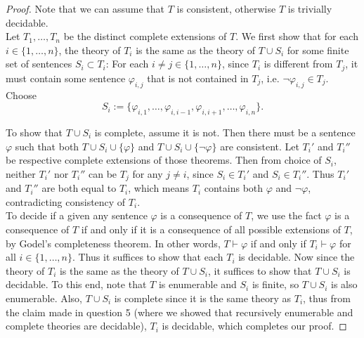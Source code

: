 \documentclass{article}
\begin{document}
\begin{enumerate}[label={\bf Q\arabic*:}]
    \begin{proof}
      Note that we can assume that $T$ is consistent, otherwise $T$ is
      trivially decidable. \\

      Let $T_1,\ldots,T_n$ be the distinct complete extensions of $T$.
      We first show that for each $i\in\{1,\ldots,n\}$, the theory of $T_i$
      is the same as the theory of $T\cup S_i$ for some finite set of
      sentences $S_i\subset T_i$: For each $i\neq j\in\{1,\ldots,n\}$,
      since $T_i$ is different from $T_j$, it must contain some sentence
      $\varphi_{i,j}$ that is not contained in $T_j$, i.e.
      $\neg\varphi_{i,j}\in T_j$. Choose
      \[S_i :=\{\varphi_{i,1},\ldots,\varphi_{i,i-1},
      \varphi_{i,i+1},\ldots,\varphi_{i,n}\}.\]

      To show that $T\cup S_i$ is complete, assume it is not. Then there
      must be a sentence $\varphi$ such that both $T\cup
      S_i\cup\{\varphi\}$ and $T\cup S_i\cup\{\neg\varphi\}$ are
      consistent. Let $T_i'$ and $T_i''$ be respective complete extensions
      of those theorems. Then from choice of $S_i$, neither $T_i'$ nor
      $T_i''$ can be $T_j$ for any $j\neq i$, since $S_i\in T_i'$ and
      $S_i\in T_i''$. Thus $T_i'$ and $T_i''$ are both equal to $T_i$,
      which means $T_i$ contains both $\varphi$ and $\neg\varphi$,
      contradicting consistency of $T_i$. \\

      To decide if a given any sentence $\varphi$ is a consequence of $T$,
      we use the fact $\varphi$ is a consequence of $T$ if and only if it
      is a consequence of all possible extensions of $T$, by Godel's
      completeness theorem. In other words, $T\vdash\varphi$ if and only if
      $T_i\vdash\varphi$ for all $i\in\{1,\ldots,n\}$. Thus it suffices to
      show that each $T_i$ is decidable. Now since the theory of $T_i$ is
      the same as the theory of $T\cup S_i$, it suffices to show that
      $T\cup S_i$ is decidable. To this end, note that $T$ is enumerable
      and $S_i$ is finite, so $T\cup S_i$ is also enumerable. Also, $T\cup
      S_i$ is complete since it is the same theory as $T_i$, thus from the
      claim made in question 5 (where we showed that recursively enumerable
      and complete theories are decidable), $T_i$ is decidable, which
      completes our proof.
    \end{proof}
\end{enumerate}
\end{document}
